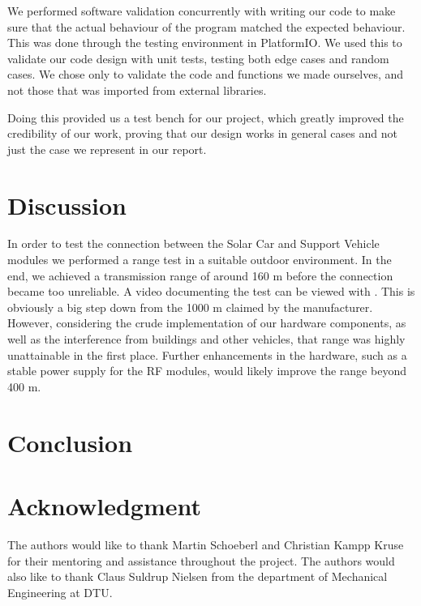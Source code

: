 \documentclass[conference]{IEEEtran}
\newcommand{\MYhref}[3][blue]{\href{#2}{\color{#1}{#3}}}
\begin{document}
We performed software validation concurrently with writing our code to make sure that the actual behaviour of the program matched the expected behaviour. This was done through the testing environment in PlatformIO. We used this to validate our code design with unit tests, testing both edge cases and random cases. We chose only to validate the code and functions we made ourselves, and not those that was imported from external libraries.

Doing this provided us a test bench for our project, which greatly improved the credibility of our work, proving that our design works in general cases and not just the case we represent in our report.

\section{Discussion}

In order to test the connection between the Solar Car and Support Vehicle modules we performed a range test in a suitable outdoor environment. In the end, we achieved a transmission range of around 160 m before the connection became too unreliable. A video documenting the test can be viewed with \MYhref{https://youtu.be/-iwST3REn40}{this link}. This is obviously a big step down from the 1000 m claimed by the manufacturer. However, considering the crude implementation of our hardware components, as well as the interference from buildings and other vehicles, that range was highly unattainable in the first place. Further enhancements in the hardware, such as a stable power supply for the RF modules, would likely improve the range beyond 400 m. 
 

\section{Conclusion}



\section*{Acknowledgment}
The authors would like to thank Martin Schoeberl and Christian Kampp Kruse for their mentoring and assistance throughout the project. The authors would also like to thank Claus Suldrup Nielsen from the department of Mechanical Engineering at DTU.


\printbibliography
\end{document}
